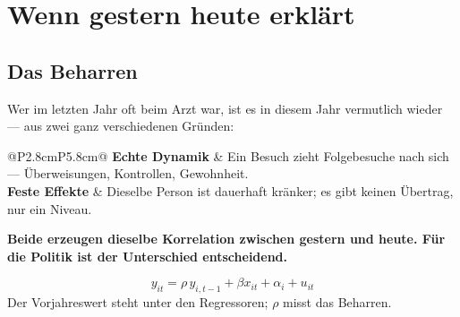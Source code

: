\chapter{Wenn gestern heute erklärt}

\section{Das Beharren}

\begin{merksatz}
Wer im letzten Jahr oft beim Arzt war, ist es in diesem Jahr vermutlich wieder --- aus zwei ganz verschiedenen Gründen:

\begin{center}
{\small
\renewcommand{\arraystretch}{1.52}
\begin{tabular}{@{}P{2.8cm}P{5.8cm}@{}}
\toprule
\textbf{Echte Dynamik} & Ein Besuch zieht Folgebesuche nach sich --- Überweisungen, Kontrollen, Gewohnheit.\\
\textbf{Feste Effekte} & Dieselbe Person ist dauerhaft kränker; es gibt keinen Übertrag, nur ein Niveau.\\
\bottomrule
\end{tabular}}
\end{center}

\begin{center}
\begin{minipage}{0.9\textwidth}
\textbf{Beide erzeugen dieselbe Korrelation zwischen gestern und heute. Für die Politik ist der Unterschied entscheidend.}
\end{minipage}
\end{center}

\begin{center}
\begin{minipage}{0.88\textwidth}
\end{minipage}
\end{center}
\end{merksatz}

\begin{definition}
\[ y_{it} = \rho\,y_{i,t-1} + \beta x_{it} + \alpha_i + u_{it} \]
Der Vorjahreswert steht unter den Regressoren; $\rho$ misst das Beharren.
\end{definition}


